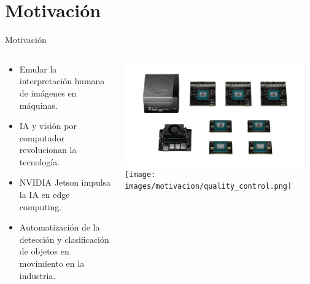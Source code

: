 \documentclass[spanish]{beamer}
\begin{document}
\section{Motivación}
\begin{frame}{Motivación}
    \begin{columns}
        \begin{column}{0.5\textwidth}
            \begin{itemize}
                \item Emular la interpretación humana de imágenes en máquinas.
                                    \item IA y visión por computador revolucionan la tecnología.
                                    \item NVIDIA Jetson impulsa la IA en edge computing.
                                    \item Automatización de la detección y clasificación de objetos en movimiento en la industria.
                            \end{itemize}
                        \end{column}

                        \begin{column}{0.5\textwidth}
                        \includegraphics[width=0.95\textwidth]{images/motivacion/jetson_family.png}
                        \texttt{[image: images/motivacion/quality\_control.png]}
                    \end{column}
                \end{columns}
            \end{frame}
            
\end{document}
